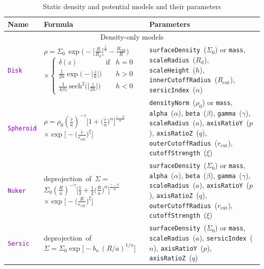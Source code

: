 \documentclass[12pt]{article}
\newcommand{\ttt}[1]{\textcolor{darkviolet}{\texttt{#1}}}
\newcommand{\ppp}[1]{\textcolor{darkolive} {\texttt{#1}}}
\begin{document}
\begin{table}
\caption{Static density and potential models and their parameters}  \label{tab:PotentialParams}
\hspace{-2mm}\begin{tabular}{l m{50mm} >{\raggedright\arraybackslash}m{80mm}}
Name & Formula & Parameters \\
\hline
\multicolumn{3}{c}{Density-only models} \\

\ttt{Disk} & $\rho = \Sigma_0\,\exp\big(-\big[\frac{R}{R_\mathrm{d}}\big]^{\frac1n} - \frac{R_\mathrm{cut}}{R}\big)$
$\times\left\{ \begin{array}{ll} \delta(z)\qquad\qquad\mbox{if} & h=0 \\[1mm]
\frac{1}{2h} \exp\big(-\big|\frac{z}{h}\big|\big) & h>0 \\[1mm]
\frac{1}{4|h|}\, \mathrm{sech}^2\big(\big|\frac{z}{2h}\big|\big) & h<0 \end{array} \right. $ &
\ppp{surfaceDensity}~($\Sigma_0$) or \ppp{mass}, \ppp{scaleRadius}~($R_\mathrm{d}$), \ppp{scaleHeight}~($h$), \ppp{innerCutoffRadius}~($R_\mathrm{cut}$), \ppp{sersicIndex}~($n$)\\

\ttt{Spheroid} & $\rho = \rho_0  \left(\frac{\tilde r}{a}\right)^{-\gamma} \Big[ 1 + \big(\frac{\tilde r}{a}\big)^\alpha \Big]^{\frac{\gamma-\beta}{\alpha}}$ $\times \exp\Big[ -\big(\frac{\tilde r}{r_\mathrm{cut}}\big)^\xi\Big] $ &
\ppp{densityNorm}~($\rho_0$) or \ppp{mass}, \ppp{alpha}~($\alpha$), \ppp{beta}~($\beta$), \ppp{gamma}~($\gamma$), \ppp{scaleRadius}~($a$), \ppp{axisRatioY}~($p$), \ppp{axisRatioZ}~($q$), \ppp{outerCutoffRadius}~($r_\mathrm{cut}$), \ppp{cutoffStrength}~($\xi$) \\[2mm]

\ttt{Nuker} & \mbox{deprojection of $\Sigma={}$} \mbox{$\Sigma_0 \left(\frac{R}{a}\right)^{-\gamma} \Big[ \frac12 + \frac12\big(\frac{R}{a}\big)^\alpha \Big]^{\frac{\gamma-\beta}{\alpha}}$} $\times \exp\Big[ -\big(\frac{R}{r_\mathrm{cut}}\big)^\xi\Big] $  & \ppp{surfaceDensity}~($\Sigma_0$) or \ppp{mass}, \ppp{alpha}~($\alpha$), \ppp{beta}~($\beta$), \ppp{gamma}~($\gamma$), \ppp{scaleRadius}~($a$), \ppp{axisRatioY}~($p$), \ppp{axisRatioZ}~($q$), \ppp{outerCutoffRadius}~($r_\mathrm{cut}$), \ppp{cutoffStrength}~($\xi$) \\[2mm]

\ttt{Sersic} & \mbox{deprojection of} \mbox{$\Sigma = \Sigma_0 \exp\big[-b_n\,(R/a)^{1/n}\big]$} & \ppp{surfaceDensity}~($\Sigma_0$) or \ppp{mass}, \ppp{scaleRadius}~($a$), \ppp{sersicIndex}~($n$), \ppp{axisRatioY}~($p$), \ppp{axisRatioZ}~($q$) \\[2mm]


\end{tabular}
\end{table}
\end{document}
